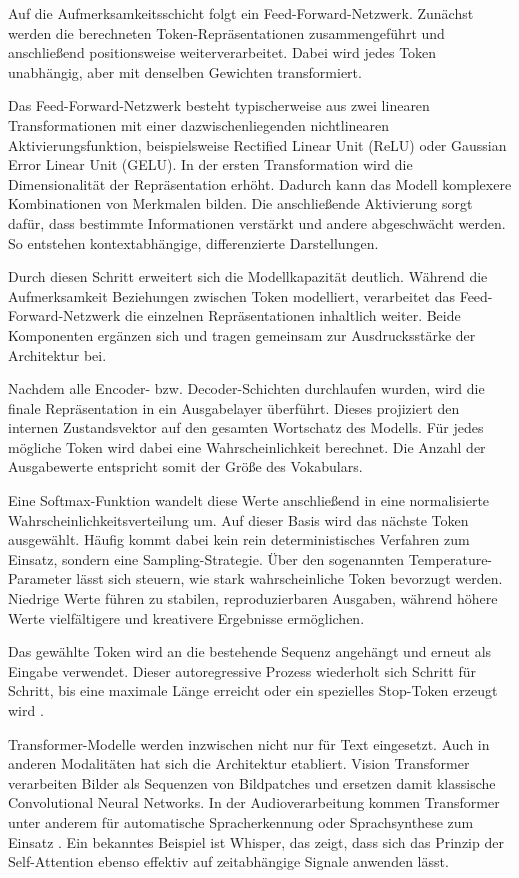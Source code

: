 Auf die Aufmerksamkeitsschicht folgt ein Feed-Forward-Netzwerk. Zunächst werden die berechneten Token-Repräsentationen zusammengeführt und anschließend positionsweise weiterverarbeitet. Dabei wird jedes Token unabhängig, aber mit denselben Gewichten transformiert.

Das Feed-Forward-Netzwerk besteht typischerweise aus zwei linearen Transformationen mit einer dazwischenliegenden nichtlinearen Aktivierungsfunktion, beispielsweise Rectified Linear Unit (ReLU) oder Gaussian Error Linear Unit (GELU). In der ersten Transformation wird die Dimensionalität der Repräsentation erhöht. Dadurch kann das Modell komplexere Kombinationen von Merkmalen bilden. Die anschließende Aktivierung sorgt dafür, dass bestimmte Informationen verstärkt und andere abgeschwächt werden. So entstehen kontextabhängige, differenzierte Darstellungen.

Durch diesen Schritt erweitert sich die Modellkapazität deutlich. Während die Aufmerksamkeit Beziehungen zwischen Token modelliert, verarbeitet das Feed-Forward-Netzwerk die einzelnen Repräsentationen inhaltlich weiter. Beide Komponenten ergänzen sich und tragen gemeinsam zur Ausdrucksstärke der Architektur bei.

Nachdem alle Encoder- bzw. Decoder-Schichten durchlaufen wurden, wird die finale Repräsentation in ein Ausgabelayer überführt. Dieses projiziert den internen Zustandsvektor auf den gesamten Wortschatz des Modells. Für jedes mögliche Token wird dabei eine Wahrscheinlichkeit berechnet. Die Anzahl der Ausgabewerte entspricht somit der Größe des Vokabulars.

Eine Softmax-Funktion wandelt diese Werte anschließend in eine normalisierte Wahrscheinlichkeitsverteilung um. Auf dieser Basis wird das nächste Token ausgewählt. Häufig kommt dabei kein rein deterministisches Verfahren zum Einsatz, sondern eine Sampling-Strategie. Über den sogenannten Temperature-Parameter lässt sich steuern, wie stark wahrscheinliche Token bevorzugt werden. Niedrige Werte führen zu stabilen, reproduzierbaren Ausgaben, während höhere Werte vielfältigere und kreativere Ergebnisse ermöglichen.

Das gewählte Token wird an die bestehende Sequenz angehängt und erneut als Eingabe verwendet. Dieser autoregressive Prozess wiederholt sich Schritt für Schritt, bis eine maximale Länge erreicht oder ein spezielles Stop-Token erzeugt wird \cite{Vaswani2017}.

Transformer-Modelle werden inzwischen nicht nur für Text eingesetzt. Auch in anderen Modalitäten hat sich die Architektur etabliert. Vision Transformer verarbeiten Bilder als Sequenzen von Bildpatches und ersetzen damit klassische Convolutional Neural Networks. In der Audioverarbeitung kommen Transformer unter anderem für automatische Spracherkennung oder Sprachsynthese zum Einsatz \cite{Prabhavalkar2023}. Ein bekanntes Beispiel ist Whisper, das zeigt, dass sich das Prinzip der Self-Attention ebenso effektiv auf zeitabhängige Signale anwenden lässt.

